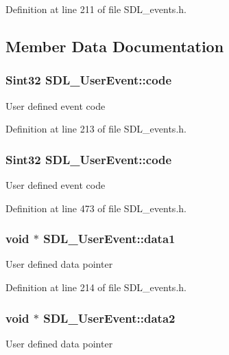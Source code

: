 Definition at line 211 of file S\+D\+L\+\_\+events.\+h.



\subsection{Member Data Documentation}
\hypertarget{structSDL__UserEvent_aef47976781ee82b527a353c5acfa0a34}{
\subsubsection[{code}]{\setlength{\rightskip}{0pt plus 5cm}Sint32 S\+D\+L\+\_\+\+User\+Event\+::code}}\label{structSDL__UserEvent_aef47976781ee82b527a353c5acfa0a34}
User defined event code 

Definition at line 213 of file S\+D\+L\+\_\+events.\+h.

\hypertarget{structSDL__UserEvent_aef47976781ee82b527a353c5acfa0a34}{
\subsubsection[{code}]{\setlength{\rightskip}{0pt plus 5cm}Sint32 S\+D\+L\+\_\+\+User\+Event\+::code}}\label{structSDL__UserEvent_aef47976781ee82b527a353c5acfa0a34}
User defined event code 

Definition at line 473 of file S\+D\+L\+\_\+events.\+h.

\hypertarget{structSDL__UserEvent_a754603ee8030d486b86b30cac48b63bd}{
\subsubsection[{data1}]{\setlength{\rightskip}{0pt plus 5cm}void $\ast$ S\+D\+L\+\_\+\+User\+Event\+::data1}}\label{structSDL__UserEvent_a754603ee8030d486b86b30cac48b63bd}
User defined data pointer 

Definition at line 214 of file S\+D\+L\+\_\+events.\+h.

\hypertarget{structSDL__UserEvent_a0375c97c4505401f3eede04b73420fa9}{
\subsubsection[{data2}]{\setlength{\rightskip}{0pt plus 5cm}void $\ast$ S\+D\+L\+\_\+\+User\+Event\+::data2}}\label{structSDL__UserEvent_a0375c97c4505401f3eede04b73420fa9}
User defined data pointer 

